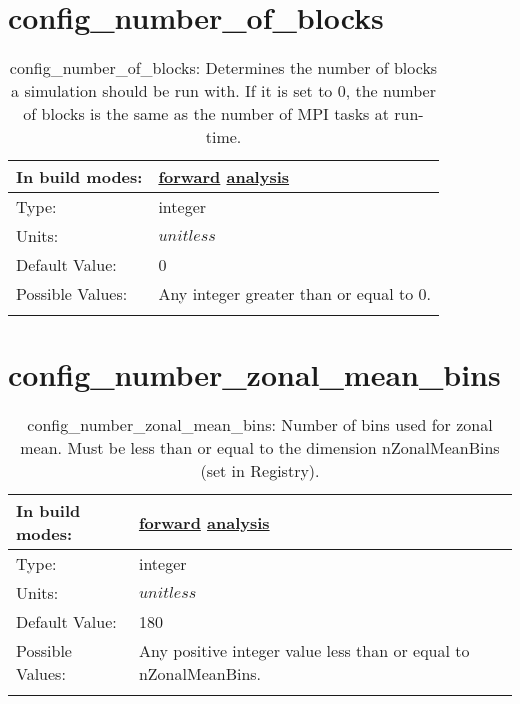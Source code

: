 \section[config\_number\_of\_blocks]{config\_number\_of\_blocks}
\label{sec:nm_sec_config_number_of_blocks}
\begin{center}
\begin{longtable}{| p{2.0in} || p{4.0in} |}
    \hline
    In build modes: & \hyperref[subsec:forward_nm_tab_decomposition]{forward} \hyperref[subsec:analysis_nm_tab_decomposition]{analysis} \\
    \hline
    Type: & integer \\
    \hline
    Units: & $unitless$ \\
    \hline
    Default Value: & 0 \\
    \hline
    Possible Values: & Any integer greater than or equal to 0. \\
    \hline
    \caption{config\_number\_of\_blocks: Determines the number of blocks a simulation should be run with. If it is set to 0, the number of blocks is the same as the number of MPI tasks at run-time.}
\end{longtable}
\end{center}
\section[config\_number\_zonal\_mean\_bins]{config\_number\_zonal\_mean\_bins}
\label{sec:nm_sec_config_number_zonal_mean_bins}
\begin{center}
\begin{longtable}{| p{2.0in} || p{4.0in} |}
    \hline
    In build modes: & \hyperref[subsec:forward_nm_tab_zonal_mean]{forward} \hyperref[subsec:analysis_nm_tab_zonal_mean]{analysis} \\
    \hline
    Type: & integer \\
    \hline
    Units: & $unitless$ \\
    \hline
    Default Value: & 180 \\
    \hline
    Possible Values: & Any positive integer value less than or equal to nZonalMeanBins. \\
    \hline
    \caption{config\_number\_zonal\_mean\_bins: Number of bins used for zonal mean.  Must be less than or equal to the dimension nZonalMeanBins (set in Registry).}
\end{longtable}
\end{center}
